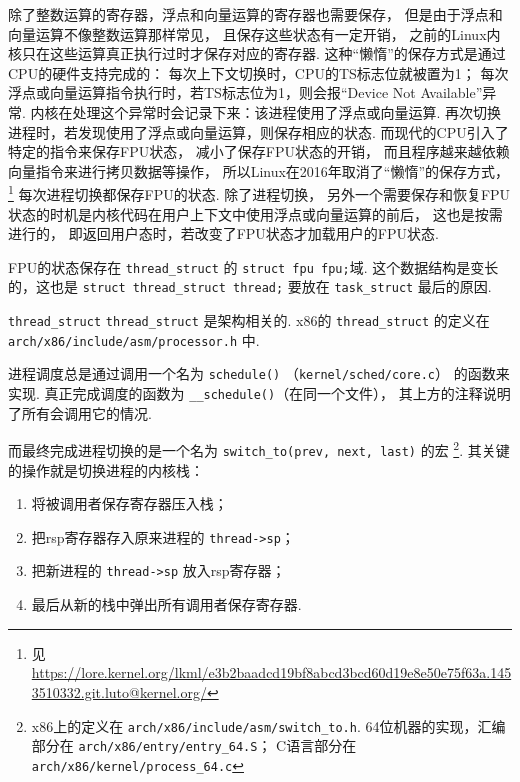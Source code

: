除了整数运算的寄存器，浮点和向量运算的寄存器也需要保存，
但是由于浮点和向量运算不像整数运算那样常见，
且保存这些状态有一定开销，
之前的Linux内核只在这些运算真正执行过时才保存对应的寄存器.
这种“懒惰”的保存方式是通过CPU的硬件支持完成的：
每次上下文切换时，CPU的TS标志位就被置为1；
每次浮点或向量运算指令执行时，若TS标志位为1，则会报“Device Not Available”异常.
内核在处理这个异常时会记录下来：该进程使用了浮点或向量运算.
再次切换进程时，若发现使用了浮点或向量运算，则保存相应的状态.\cite{bovet2005understanding}
而现代的CPU引入了特定的指令来保存FPU状态，
减小了保存FPU状态的开销，
而且程序越来越依赖向量指令来进行拷贝数据等操作，
所以Linux在2016年取消了“懒惰”的保存方式，
\footnote{见 \url{https://lore.kernel.org/lkml/e3b2baadcd19bf8abcd3bcd60d19e8e50e75f63a.1453510332.git.luto@kernel.org/}}
每次进程切换都保存FPU的状态.
除了进程切换，
另外一个需要保存和恢复FPU状态的时机是内核代码在用户上下文中使用浮点或向量运算的前后，
这也是按需进行的，
即返回用户态时，若改变了FPU状态才加载用户的FPU状态.

FPU的状态保存在 \lstinline{thread_struct} 的 \lstinline{struct fpu fpu;}域.
这个数据结构是变长的，这也是 \lstinline{struct thread_struct thread;}
要放在 \lstinline{task_struct} 最后的原因.

\begin{readsrcbox}{\lstinline{thread_struct}}
	\lstinline{thread_struct} 是架构相关的.
	x86的 \lstinline{thread_struct} 的定义在 \lstinline{arch/x86/include/asm/processor.h} 中.

	进程调度总是通过调用一个名为 \lstinline{schedule()}
	（\lstinline{kernel/sched/core.c}） 的函数来实现.
	真正完成调度的函数为 \lstinline{__schedule()}（在同一个文件），
	其上方的注释说明了所有会调用它的情况.

	而最终完成进程切换的是一个名为 \lstinline{switch_to(prev, next, last)} 的宏
	\footnote{x86上的定义在 \lstinline{arch/x86/include/asm/switch_to.h}.
		64位机器的实现，汇编部分在 \lstinline{arch/x86/entry/entry_64.S}；
		C语言部分在 \lstinline{arch/x86/kernel/process_64.c}}.
	其关键的操作就是切换进程的内核栈：
	\begin{enumerate}
		\item 将被调用者保存寄存器压入栈；
		\item 把rsp寄存器存入原来进程的 \lstinline{thread->sp}；
		\item 把新进程的 \lstinline{thread->sp} 放入rsp寄存器；
		\item 最后从新的栈中弹出所有调用者保存寄存器.
	\end{enumerate}
\end{readsrcbox}

